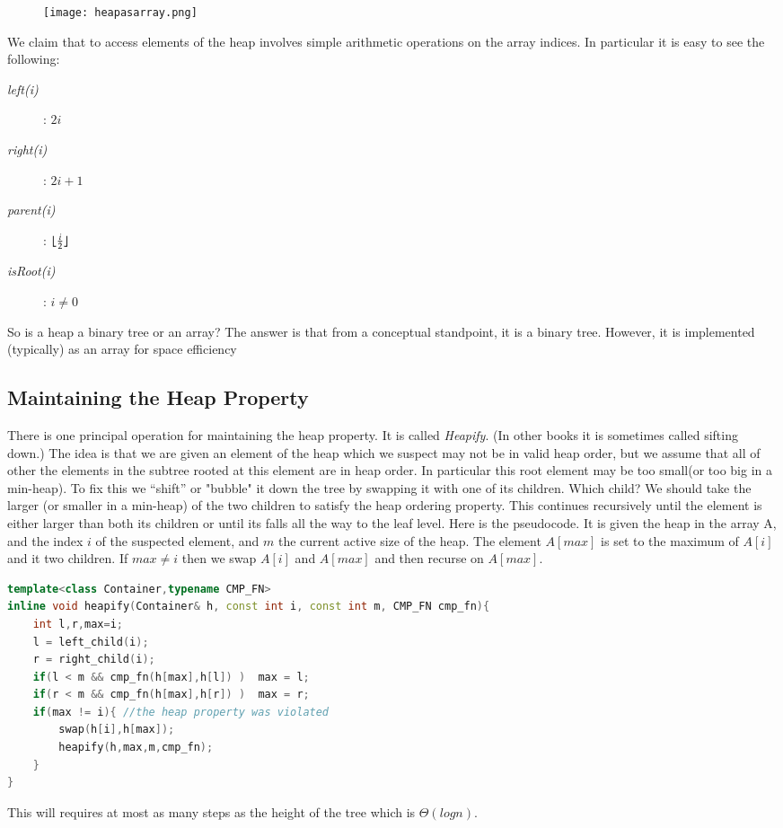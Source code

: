 \begin{figure}
\label{fig:heapasarray}
		\texttt{[image: heapasarray.png]}
\end{figure}
We claim that to access elements of the heap involves simple arithmetic operations on the array indices.
In particular it is easy to see the following:
\begin{description}
\item[\textit{left(i)}]: $2i$
\item[\textit{right(i)}]: $2i+1$
\item[\textit{parent(i)}]: $\lfloor\frac{i}{2}\rfloor$
\item[\textit{isRoot(i)}]: $i \neq 0$
\end{description}

So is a heap a binary tree or an array? The answer is that from a conceptual standpoint, it is a binary
tree. However, it is implemented (typically) as an array for space efficiency

\subsection{Maintaining the Heap Property}
There is one principal operation for maintaining the heap property. It is
called \textit{Heapify}. (In other books it is sometimes called sifting down.) The idea is that we are given an element of the heap which we suspect may not be in valid heap order, but we assume that all of other the elements in the subtree rooted at this element are in heap order. In particular this root element may be too small(or too big in a min-heap). To fix this we “shift” or "bubble" it down the tree by swapping it with one of its children. Which child? We should take the larger (or smaller in a min-heap) of the two children to satisfy the heap ordering property. This continues recursively until the element is either larger than both its children or until its falls all the way to the leaf level. Here is the pseudocode. It is given the heap in the array A, and the index $i$ of the suspected element, and $m$ the current active size of the heap. The element $A[max]$ is set to the maximum of $A[i]$ and it two children. If $max \neq i$ then we swap $A[i]$ and $A[max]$ and then recurse on $A[max]$.


\begin{lstlisting}[language=c++, caption="Heapify procedure in heapsort"]
template<class Container,typename CMP_FN>
inline void heapify(Container& h, const int i, const int m, CMP_FN cmp_fn){
    int l,r,max=i;
    l = left_child(i);
    r = right_child(i);
    if(l < m && cmp_fn(h[max],h[l]) )  max = l;
    if(r < m && cmp_fn(h[max],h[r]) )  max = r;
    if(max != i){ //the heap property was violated
        swap(h[i],h[max]);
        heapify(h,max,m,cmp_fn);
    }
}
\end{lstlisting}
This will requires at most as many steps as the height of the tree which is $\mathcal{\Theta}(log n)$.
